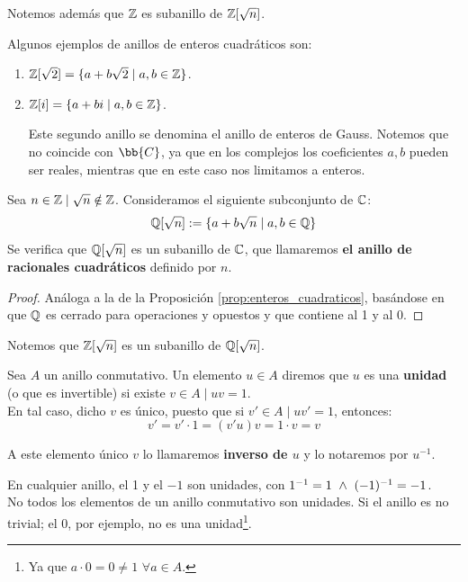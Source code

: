 Notemos además que $\mathbb Z$ es subanillo de $\mathbb Z[\sqrt{n}]$.

\begin{ejemplo} Algunos ejemplos de anillos de enteros cuadráticos son:
\begin{enumerate}
    \item $\mathbb Z[\sqrt{2}] = \{a+b\sqrt{2} \mid a,b \in \mathbb Z\}$.
    \item $\mathbb Z[i] = \{a+bi \mid a,b \in \mathbb Z\}$.

    Este segundo anillo se denomina el anillo de enteros de Gauss. Notemos que no coincide con $\bb{C}$, ya que en los complejos los coeficientes $a,b$ pueden ser reales, mientras que en este caso nos limitamos a enteros.
\end{enumerate}
\end{ejemplo}

\begin{prop}
    Sea $n \in \mathbb Z \mid \sqrt{n} \notin \mathbb Z$. Consideramos el siguiente subconjunto de $\mathbb C$:
    $$\mathbb Q[\sqrt{n}] := \{a+b \sqrt{n} \mid a,b \in \mathbb Q\}$$
    Se verifica que $\mathbb Q[\sqrt{n}]$ es un subanillo de $\mathbb C$, que llamaremos \textbf{el anillo de racionales cuadráticos} definido
    por $n$.
\end{prop}
\begin{proof}
    Análoga a la de la Proposición \ref{prop:enteros_cuadraticos}, basándose en que $\mathbb Q$ es cerrado para operaciones y opuestos y que contiene al 1 y al 0.
\end{proof}

Notemos que $\mathbb Z[\sqrt{n}]$ es un subanillo de $\mathbb Q[\sqrt{n}]$.

\begin{definicion}[Unidad]
    Sea $A$ un anillo conmutativo. Un elemento $u \in A$ diremos que $u$ es una \textbf{unidad} (o que es invertible)
    si existe $v \in A \mid uv = 1$.\\

    En tal caso, dicho $v$ es único, puesto que si $v' \in A \mid uv' = 1$, entonces:
    $$v' = v' \cdot 1 = (v'u)v = 1 \cdot v = v$$

    A este elemento único $v$ lo llamaremos \textbf{inverso de $u$} y lo notaremos por $u^{-1}$.
\end{definicion}

En cualquier anillo, el 1 y el $-1$ son unidades, con $1^{-1} = 1 \ \land \  (-1)^{-1} = -1$.\\


No todos los elementos de un anillo conmutativo son unidades. Si el anillo es no trivial; el 0, por ejemplo, no es una unidad\footnote{Ya que $a\cdot 0=0\neq 1$ $\forall a\in A$.}.\\


